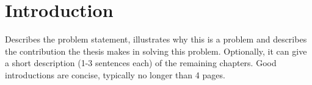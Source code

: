 \documentclass[12pt]{article}
\begin{document}



\tableofcontents
\newpage
\listoffigures
\pagebreak
\listoftables
\pagebreak

\section{Introduction}
\label{sec:1}

Describes the problem statement, illustrates why this is a problem and describes the contribution the thesis makes in solving this problem. Optionally, 
it can give a short description (1-3 sentences each) of the remaining chapters. Good introductions are concise, typically no longer than 4 pages.\\
\end{document}
